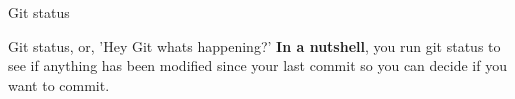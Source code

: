 \begin{frame}{Git status}
    \begin{block}{Git status, or, 'Hey Git whats happening?'}
    \textbf{In a nutshell}, you run git status to see if anything has been modified since your last commit so you can decide if you want to commit.
    
    \end{block}
    \pause
\end{frame}
